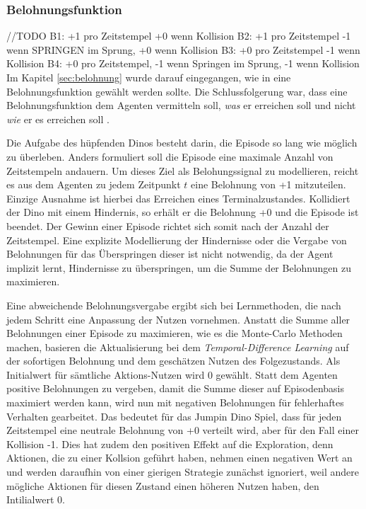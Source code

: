 \subsubsection{Belohnungsfunktion}\label{sec:JDbelohnungsfunktion}
//TODO
B1: +1 pro Zeitstempel +0 wenn Kollision
B2: +1 pro Zeitstempel -1 wenn SPRINGEN im Sprung, +0 wenn Kollision
B3: +0 pro Zeitstempel -1 wenn Kollision
B4: +0 pro Zeitstempel, -1 wenn Springen im Sprung, -1 wenn Kollision
Im Kapitel \ref{sec:belohnung} wurde darauf eingegangen, wie in eine Belohnungsfunktion gewählt werden sollte. Die Schlussfolgerung war, dass eine Belohnungsfunktion dem Agenten vermitteln soll, \textit{was} er erreichen soll und nicht \textit{wie} er es erreichen soll \cite[S.~54]{Sutton1998}.
\par 
Die Aufgabe des hüpfenden Dinos besteht darin, die Episode so lang wie möglich zu überleben. Anders formuliert soll die Episode eine maximale Anzahl von Zeitstempeln andauern. Um dieses Ziel als Belohungssignal zu modellieren, reicht es aus dem Agenten zu jedem Zeitpunkt $t$ eine Belohnung von +1 mitzuteilen. Einzige Ausnahme ist hierbei das Erreichen eines Terminalzustandes. Kollidiert der Dino mit einem Hindernis, so erhält er die Belohnung +0 und die Episode ist beendet. Der Gewinn einer Episode richtet sich somit nach der Anzahl der Zeitstempel. Eine explizite Modellierung der Hindernisse oder die Vergabe von Belohnungen für das Überspringen dieser ist nicht notwendig, da der Agent implizit lernt, Hindernisse zu überspringen, um die Summe der Belohnungen zu maximieren. 
\par 
Eine abweichende Belohnungsvergabe ergibt sich bei Lernmethoden, die nach jedem Schritt eine Anpassung der Nutzen vornehmen. Anstatt die Summe aller Belohnungen einer Episode zu maximieren, wie es die Monte-Carlo Methoden machen, basieren die Aktualisierung bei dem \textit{Temporal-Difference Learning} auf der sofortigen Belohnung und dem geschätzen Nutzen des Folgezustands. Als Initialwert für sämtliche Aktions-Nutzen wird 0 gewählt. Statt dem Agenten positive Belohnungen zu vergeben, damit die Summe dieser auf Episodenbasis maximiert werden kann, wird nun mit negativen Belohnungen für fehlerhaftes Verhalten gearbeitet. Das bedeutet für das Jumpin Dino Spiel, dass für jeden Zeitstempel eine neutrale Belohnung von +0 verteilt wird, aber für den Fall einer Kollision -1. Dies hat zudem den positiven Effekt auf die Exploration, denn Aktionen, die zu einer Kollsion geführt haben, nehmen einen negativen Wert an und werden daraufhin von einer gierigen Strategie zunächst ignoriert, weil andere mögliche Aktionen für diesen Zustand einen höheren Nutzen haben, den Intilialwert 0.

